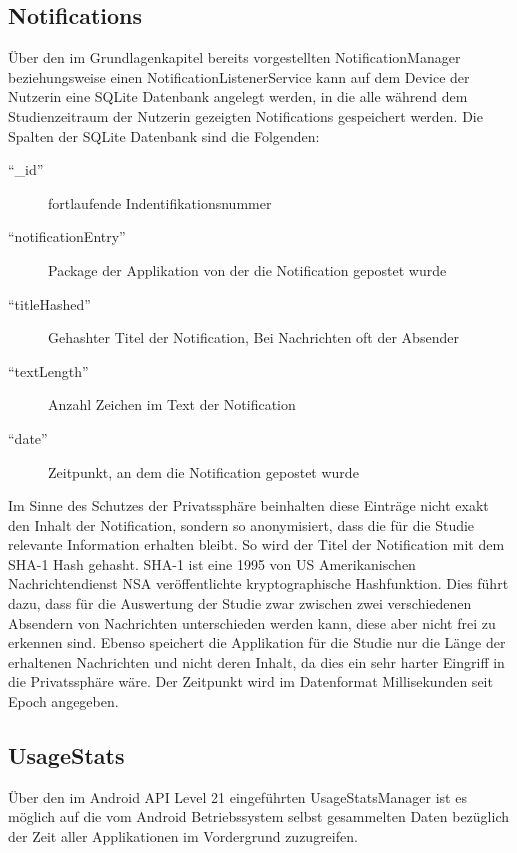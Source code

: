 \subsection{Notifications}


Über den im Grundlagenkapitel bereits vorgestellten NotificationManager beziehungsweise einen NotificationListenerService kann auf dem Device der Nutzerin eine SQLite Datenbank angelegt werden,
in die alle während dem Studienzeitraum der Nutzerin gezeigten Notifications gespeichert werden.
Die Spalten der SQLite Datenbank sind die Folgenden:
\begin{description}
    \item ["`\_id"'] fortlaufende Indentifikationsnummer
    \item ["`notificationEntry"'] Package der Applikation von der die Notification gepostet wurde
    \item ["`titleHashed"'] Gehashter Titel der Notification, Bei Nachrichten oft der Absender
    \item ["`textLength"'] Anzahl Zeichen im Text der Notification
    \item ["`date"'] Zeitpunkt, an dem die Notification gepostet wurde
\end{description}

Im Sinne des Schutzes der Privatssphäre beinhalten diese Einträge nicht exakt den Inhalt der Notification, sondern so anonymisiert, dass die für die Studie relevante Information erhalten bleibt.
So wird der Titel der Notification mit dem SHA-1 Hash\cite{sha1def} gehasht.
SHA-1 ist eine 1995 von US Amerikanischen Nachrichtendienst NSA veröffentlichte kryptographische Hashfunktion\cite{sha1proposal}.
Dies führt dazu, dass für die Auswertung der Studie zwar zwischen zwei verschiedenen Absendern von Nachrichten unterschieden werden kann, diese aber nicht frei zu erkennen sind.
Ebenso speichert die Applikation für die Studie nur die Länge der erhaltenen Nachrichten und nicht deren Inhalt, da dies ein sehr harter Eingriff in die Privatssphäre wäre.
Der Zeitpunkt wird im Datenformat Millisekunden seit Epoch angegeben.


\subsection{UsageStats}

Über den im Android API Level 21 eingeführten UsageStatsManager ist es möglich 
auf die vom Android Betriebssystem selbst gesammelten Daten bezüglich der Zeit aller Applikationen im Vordergrund zuzugreifen.



